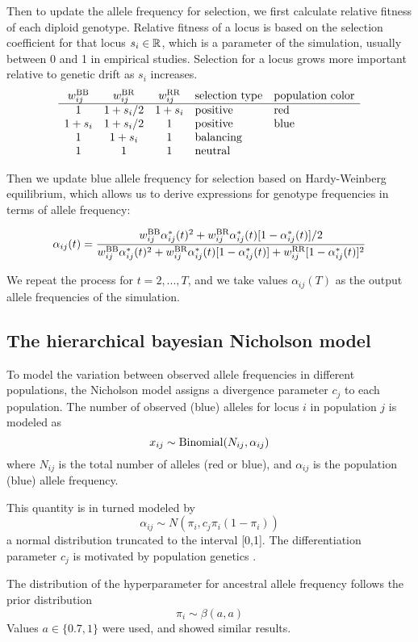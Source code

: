 \documentclass[a4paper,12pt]{article}
\begin{document}
Then to update the allele frequency for selection, we first calculate
relative fitness of each diploid genotype. Relative fitness of a locus
is based on the selection coefficient for that locus $s_i\in \mathbb R$,
which is a parameter of the simulation, usually between 0 and 1 in
empirical studies. Selection for a locus grows more important relative
to genetic drift as $s_i$ increases.
$$
\begin{array}{cccll}
w_{ij}^{\text{BB}} & w_{ij}^{\text{BR}} & w_{ij}^{\text{RR}} & \text{selection type} & \text{population color}\\
\hline
1 & 1+s_i/2 & 1+s_i & \text{positive}& \text{red}\\
1+s_i & 1+s_i/2 & 1 & \text{positive}& \text{blue}\\
1 & 1+s_i & 1 & \text{balancing}& \\
1 & 1 & 1 & \text{neutral}& 
\end{array}
$$

Then we update blue allele frequency for selection based on
Hardy-Weinberg equilibrium, which allows us to derive expressions for
genotype frequencies in terms of allele frequency:

$$\alpha_{ij}(t) = \frac{
w_{ij}^{\text{BB}}\alpha_{ij}^*(t)^2 + w_{ij}^{\text{BR}}\alpha_{ij}^*(t)[1-\alpha_{ij}^*(t)]/2 }{
w_{ij}^{\text{BB}}\alpha_{ij}^*(t)^2 + w_{ij}^{\text{BR}}\alpha_{ij}^*(t)[1-\alpha_{ij}^*(t)] + w_{ij}^{\text{RR}}[1-\alpha_{ij}^*(t)]^2
   }$$

   We repeat the process for $t=2, ..., T$, and we take values
   $\alpha_{ij}(T)$ as the output allele frequencies of the
   simulation.



\subsection{The hierarchical bayesian Nicholson model}

To model the variation between observed allele frequencies in
different populations, the Nicholson model assigns a divergence
parameter $c_j$ to each population. The number of observed (blue)
alleles for locus $i$ in population $j$ is modeled as
$$x_{ij}\sim \operatorname{Binomial}(N_{ij},\alpha_{ij})$$ where $N_{ij}$ is the total
number of alleles (red or blue), and $\alpha_{ij}$ is the population
(blue) allele frequency.

This quantity is in turned modeled by
$$\alpha_{ij}\sim N(\pi_i, c_j\pi_i(1-\pi_i))$$
a normal distribution truncated to the interval [0,1]. The
differentiation parameter $c_j$ is motivated by population genetics
\cite[section 2.2]{nicholson}.

The distribution of the hyperparameter for ancestral allele frequency
follows the prior distribution
$$\pi_i\sim \beta(a,a)$$
Values $a\in\{0.7,1\}$ were used, and showed similar results.
\end{document}
